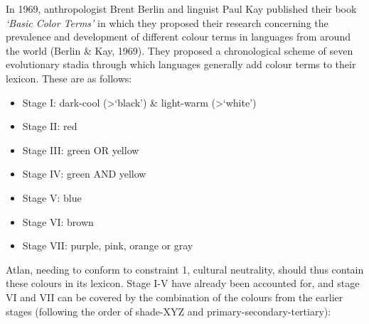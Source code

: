 
In 1969, anthropologist Brent Berlin and linguist Paul Kay published their book \textit{‘Basic Color Terms’} in which they proposed their research concerning the prevalence and development of different colour terms in languages from around  the world (Berlin \& Kay, 1969). They proposed a chronological scheme of seven evolutionary stadia through which languages generally add colour terms to their lexicon. These are as follows: 

\begin{itemize}
\item Stage I: dark-cool (>‘black’) \& light-warm (>‘white’) 

\item Stage II: red 

\item Stage III:  green OR yellow 

\item Stage IV:  green AND yellow 

\item Stage V:  blue 

\item Stage VI:  brown 

\item Stage VII:  purple, pink, orange or gray 
\end{itemize}

Atlan, needing to conform to constraint 1, cultural neutrality, should thus contain these colours in its lexicon. Stage I-V have already been accounted for, and stage VI and VII can be covered by the combination of the colours from the earlier stages (following the order of shade-XYZ and primary-secondary-tertiary): 

